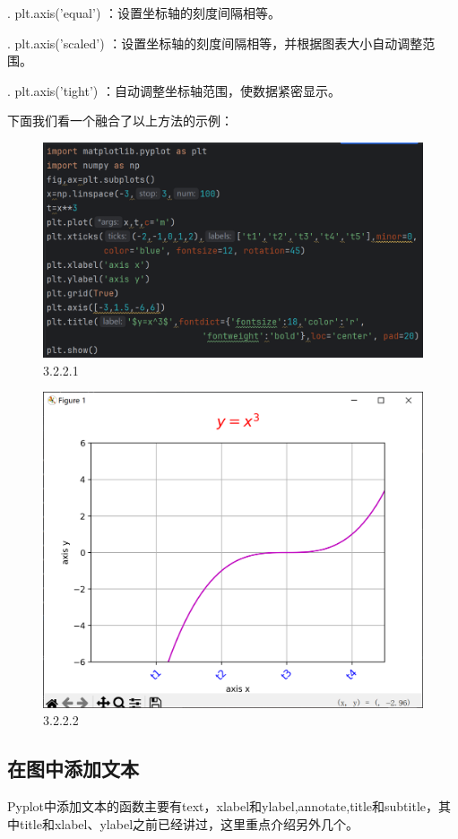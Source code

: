 \documentclass[12pt]{article}
\begin{document}
 . plt.axis('equal')  ：设置坐标轴的刻度间隔相等。  

. plt.axis('scaled')  ：设置坐标轴的刻度间隔相等，并根据图表大小自动调整范围。

. plt.axis('tight')  ：自动调整坐标轴范围，使数据紧密显示。





下面我们看一个融合了以上方法的示例：
 \begin{figure}[H]
     \centering
     \includegraphics[width=0.9\linewidth]{pyplot坐标轴program1.png}
     \caption{3.2.2.1}
     \label{fig:enter-label}
 \end{figure}

\begin{figure}[H]
    \centering
    \includegraphics[width=0.65\linewidth]{pyplot坐标轴Pic1.png}
    \caption{3.2.2.2}
    \label{fig:enter-label}
\end{figure}

\subsection{在图中添加文本}
Pyplot中添加文本的函数主要有text，xlabel和ylabel,annotate,title和subtitle，其中title和xlabel、ylabel之前已经讲过，这里重点介绍另外几个。
\end{document}
